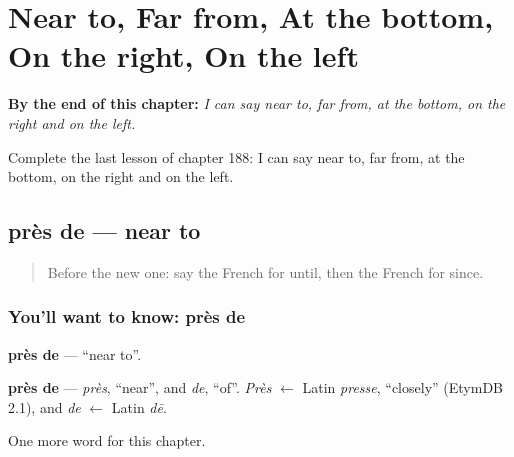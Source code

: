 
\chapter{Near to, Far from, At the bottom, On the right, On the left}
\label{ch:fr-near-to-far-from-at-the-bottom-on-the-right-on-the-left}

\begin{chapteropening}
\textbf{By the end of this chapter:} \emph{I can say near to, far from, at the bottom, on the right and on the left.}

Complete the last lesson of chapter 188: I can say near to, far from, at the bottom, on the right and on the left.
\end{chapteropening}

\section[près de]{près de — near to}

\label{lesson:FR-C188-pres-de}



\begin{quote}
Before the new one: say the French for until, then the French for since.
\end{quote}

\subsection*{You'll want to know: près de}
\textbf{près de} — \textquotedblleft{}near to\textquotedblright{}.

\begin{cousinweb}
\textbf{près de} — \emph{près}, \textquotedblleft{}near\textquotedblright{}, and \emph{de}, \textquotedblleft{}of\textquotedblright{}. \emph{Près} $\leftarrow$ Latin \emph{presse}, \textquotedblleft{}closely\textquotedblright{} (EtymDB 2.1), and \emph{de} $\leftarrow$ Latin \emph{dē}.
\end{cousinweb}

\begin{grammarlens}[title={What you've built}]
One more word for this chapter.
\end{grammarlens}

